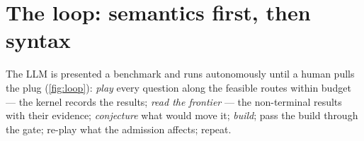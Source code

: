 
\section{The loop: semantics first, then syntax}
\label{sec:loop}

The LLM is presented a benchmark and runs autonomously until a human
pulls the plug (\cref{fig:loop}): \emph{play} every question along
the feasible routes within budget --- the kernel records the
results; \emph{read the frontier} --- the non-terminal results with
their evidence; \emph{conjecture} what would move it;
\emph{build}; pass the build through the gate; re-play what the
admission affects; repeat.

